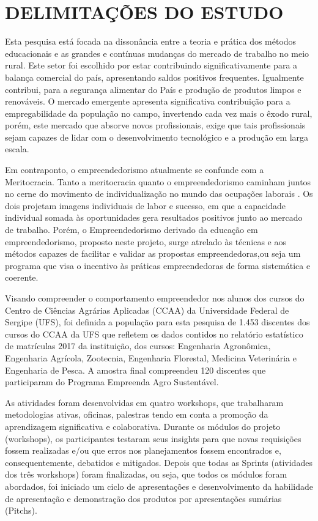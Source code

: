 \section{DELIMITAÇÕES DO ESTUDO}

Esta pesquisa está focada na dissonância entre a teoria e prática dos métodos educacionais e as grandes e contínuas mudanças do mercado de trabalho no meio rural. Este setor foi escolhido por estar contribuindo significativamente para a balança comercial do país, apresentando saldos positivos frequentes. Igualmente contribui, para a segurança alimentar do País e produção de produtos limpos e renováveis. O mercado emergente apresenta significativa contribuição para a empregabilidade da população no campo, invertendo cada vez mais o êxodo rural, porém, este mercado que absorve novos profissionais, exige que tais profissionais sejam capazes de lidar com o desenvolvimento tecnológico e a produção em larga escala. 

Em contraponto, o empreendedorismo atualmente se confunde com a Meritocracia. Tanto a meritocracia quanto o empreendedorismo caminham juntos no cerne do movimento de individualização no mundo das ocupações laborais \cite{costa_novo_2019}. Os dois projetam imagens individuais de labor e sucesso, em que a capacidade individual somada às oportunidades gera resultados positivos junto ao mercado de trabalho. Porém, o Empreendedorismo derivado da educação em empreendedorismo, proposto neste projeto, surge atrelado às técnicas e aos métodos capazes de facilitar e validar as propostas empreendedoras,ou seja um programa que visa o incentivo às práticas empreendedoras de forma sistemática e coerente.

Visando compreender o comportamento empreendedor nos alunos dos cursos do Centro de Ciências Agrárias Aplicadas (CCAA) da Universidade Federal de Sergipe (UFS), foi definida a população para esta pesquisa de 1.453 discentes dos cursos do CCAA da UFS que refletem os dados contidos no relatório estatístico de matrículas 2017 da instituição, dos cursos: Engenharia Agronômica, Engenharia Agrícola, Zootecnia, Engenharia Florestal, Medicina Veterinária e Engenharia de Pesca. A amostra final compreendeu 120 discentes que participaram do Programa Empreenda Agro Sustentável.

As atividades foram desenvolvidas em quatro workshops, que trabalharam metodologias ativas, oficinas, palestras tendo em conta a promoção da aprendizagem significativa e colaborativa. Durante os módulos do projeto (workshops), os participantes testaram seus insights para que novas requisições fossem realizadas e/ou que erros nos planejamentos fossem encontrados e, consequentemente, debatidos e mitigados. Depois que todas as Sprints (atividades dos três workshops) foram finalizadas, ou seja, que todos os módulos foram abordados, foi iniciado um ciclo de apresentações e desenvolvimento da habilidade de apresentação e demonstração dos produtos por apresentações sumárias (Pitchs). 

